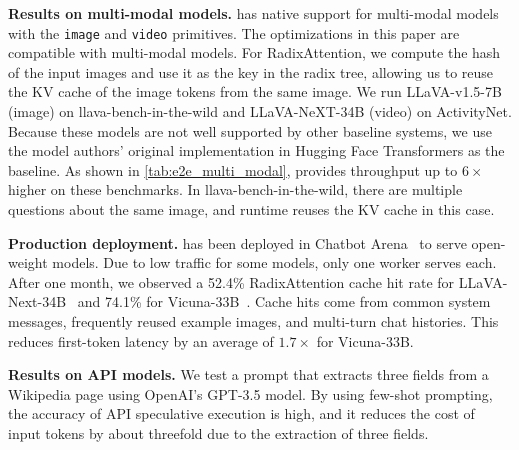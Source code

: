 \textbf{Results on multi-modal models.}
\lang has native support for multi-modal models with the \texttt{image} and \texttt{video} primitives. The optimizations in this paper are compatible with multi-modal models. For RadixAttention, we compute the hash of the input images and use it as the key in the radix tree, allowing us to reuse the KV cache of the image tokens from the same image.
We run LLaVA-v1.5-7B (image) on llava-bench-in-the-wild and LLaVA-NeXT-34B (video) on ActivityNet. Because these models are not well supported by other baseline systems, we use the model authors' original implementation in Hugging Face Transformers as the baseline.
As shown in \autoref{tab:e2e_multi_modal}, \lang provides throughput up to $6\times$ higher on these benchmarks. In llava-bench-in-the-wild, there are multiple questions about the same image, and \lang runtime reuses the KV cache in this case.


\begin{table}[t]
\footnotesize
\centering
\vspace{-1.5em}
\caption{Throughput comparison on multi-modal LLaVA image and video models.}
\vspace{2em}
\label{tab:e2e_multi_modal}
\end{table}

\textbf{Production deployment.}
\lang has been deployed in Chatbot Arena~\cite{chiang2024chatbot} to serve open-weight models. Due to low traffic for some models, only one \lang worker serves each. After one month, we observed a 52.4\% RadixAttention cache hit rate for LLaVA-Next-34B~\cite{liu2024llavanext} and 74.1\% for Vicuna-33B~\cite{vicuna2023}. Cache hits come from common system messages, frequently reused example images, and multi-turn chat histories. This reduces first-token latency by an average of $1.7\times$ for Vicuna-33B.

\textbf{Results on API models.} We test a prompt that extracts three fields from a Wikipedia page using OpenAI's GPT-3.5 model. By using few-shot prompting, the accuracy of API speculative execution is high, and it reduces the cost of input tokens by about threefold due to the extraction of three fields.


